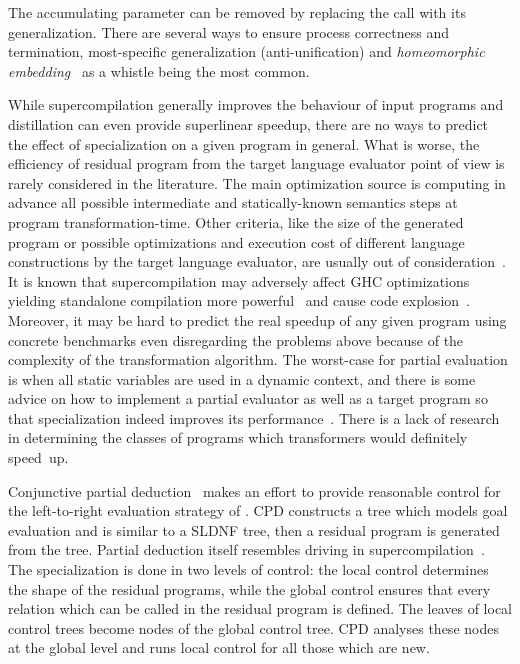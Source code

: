 The accumulating parameter can be removed by replacing the call with its generalization.
There are several ways to ensure process correctness and termination, most-specific generalization
(anti-unification) and \emph{homeomorphic embedding}~\cite{Higman52,Kruskal60} as a
whistle being the most common.

While supercompilation generally improves the behaviour of input programs and distillation can even provide superlinear speedup, there are no ways to predict the effect of specialization on a given program in general.
What is worse, the efficiency of residual program from the target language evaluator point of view is rarely considered in the literature.
The main optimization source is computing in advance all possible intermediate and statically-known semantics steps at program transformation-time.
Other criteria, like the size of the generated program or possible optimizations and execution cost of different language constructions by the target language evaluator, are usually out of consideration~\cite{jonesbook}.
It is known that supercompilation may adversely affect GHC optimizations yielding standalone compilation more powerful~\cite{SCBE,TCES} and cause code explosion~\cite{SCHC}.
Moreover, it may be hard to predict the real speedup of any given program using concrete benchmarks even disregarding the problems above because of the complexity of the transformation algorithm.
The worst-case for partial evaluation is when all static variables are used in a dynamic context, and there is some advice on how to implement a partial evaluator as well as a target program so that specialization indeed improves its performance~\cite{jonesbook,bulyonkov84}.
There is a lack of research in determining the classes of programs which transformers would definitely speed~up.

Conjunctive partial deduction~\cite{de1999conjunctive} makes an effort to provide reasonable control for the left-to-right evaluation strategy of \pro.
CPD constructs a tree which models goal evaluation and is similar to a SLDNF tree, then a residual program is generated from the tree.
Partial deduction itself resembles driving in supercompilation~\cite{gluck1994partial}.
The specialization is done in two levels of control: the local control determines the shape of the residual programs, while the global control ensures that every relation which can be called in the residual program is defined.
The leaves of local control trees become nodes of the global control tree.
CPD analyses these nodes at the global level and runs local control for all those which are new.

